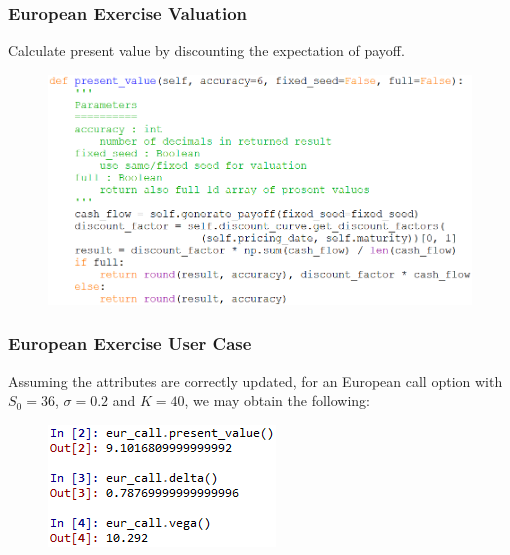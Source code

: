 \documentclass{beamer}
\begin{document}
\begin{frame}
\frametitle{European Exercise Valuation}
Calculate present value by discounting the expectation of payoff.
\begin{figure}[H]
	\includegraphics[scale=0.45]{european_present_value.png}
\end{figure}
\end{frame}

\begin{frame}
\frametitle{European Exercise User Case}
Assuming the attributes are correctly updated, for an European call option with $S_{0} = 36$, $\sigma = 0.2$ and $K = 40$, we may obtain the following:
\begin{figure}[H]
	\includegraphics[scale=1.0]{european_exercise_user_case.png}
\end{figure}
\end{frame}
\end{document}

